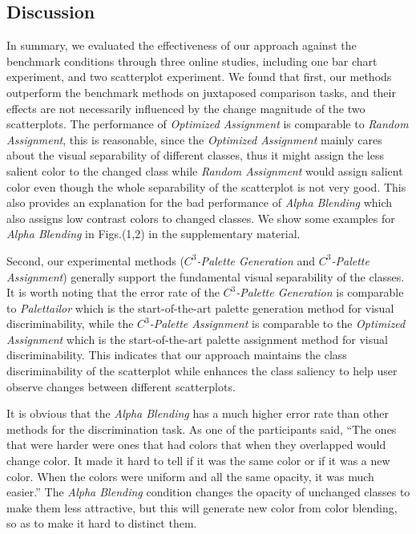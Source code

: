 \subsection{Discussion}
\label{subsec:discussionEval}
In summary, we evaluated the effectiveness of our approach against the benchmark conditions through three online studies, including one bar chart experiment, and two scatterplot experiment.
We found that first, our methods outperform the benchmark methods on juxtaposed comparison tasks, and their effects are not necessarily influenced by the change magnitude of the two scatterplots.
The performance of \emph{Optimized Assignment} is comparable to \emph{Random Assignment}, this is reasonable, since the \emph{Optimized Assignment} mainly cares about the visual separability of different classes, thus it might assign the less salient color to the changed class while \emph{Random Assignment} would assign salient color even though the whole separability of the scatterplot is not very good. This also provides an explanation for the bad performance of \emph{Alpha Blending} which also assigns low contrast colors to changed classes. We show some examples for \emph{Alpha Blending} in Figs.(1,2) in the supplementary material.

Second, our experimental methods (\emph{$C^3$-Palette Generation} and \emph{$C^3$-Palette Assignment}) generally support the fundamental visual separability of the classes. It is worth noting that the error rate of the \emph{$C^3$-Palette Generation} is comparable to \emph{Palettailor} which is the start-of-the-art palette generation method for visual discriminability, while the \emph{$C^3$-Palette Assignment} is comparable to the \emph{Optimized Assignment} which is the start-of-the-art palette assignment method for visual discriminability. This indicates that our approach maintains the class discriminability of the scatterplot while enhances the class saliency to help user observe changes between different scatterplots.

It is obvious that the \emph{Alpha Blending} has a much higher error rate than other methods for the discrimination task. As one of the participants said, ``The ones that were harder were ones that had colors that when they overlapped would change color. It made it hard to tell if it was the same color or if it was a new color. When the colors were uniform and all the same opacity, it was much easier.'' The \emph{Alpha Blending} condition changes the opacity of unchanged classes to make them less attractive, but this will generate new color from color blending, so as to make it hard to distinct them.



